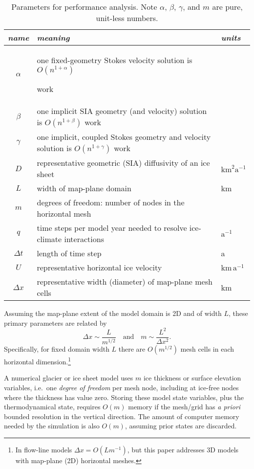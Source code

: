 \documentclass[review,letterpaper]{igs}
\begin{document}
\begin{table*}[ht]
{\normalsize
\begin{tabular}{cll}
\emph{name} & \emph{meaning} & \emph{units} \\ \hline
$\alpha$    & one fixed-geometry Stokes velocity solution is $O(n^{1+\alpha})${\large \strut} work\\
$\beta$     & one implicit SIA geometry (and velocity) solution is $O(n^{1+\beta})$ work \\
$\gamma$    & one implicit, coupled Stokes geometry and velocity solution is $O(n^{1+\gamma})$ work \\
$D$         & representative geometric (SIA) diffusivity of an ice sheet & $\text{km}^2 \text{a}^{-1}$ \\
$L$         & width of map-plane domain & km \\
$m$         & degrees of freedom: number of nodes in the horizontal mesh \\
$q$         & time steps per model year needed to resolve ice-climate interactions & $\text{a}^{-1}$ \\
$\Delta t$  & length of time step & a \\
$U$         & representative horizontal ice velocity & $\text{km}\,\text{a}^{-1}$ \\
$\Delta x$  & representative width (diameter) of map-plane mesh cells & km
\end{tabular}
}
\caption{Parameters for performance analysis.  Note $\alpha$, $\beta$, $\gamma$, and $m$ are pure, unit-less numbers.}
\label{tab:notation}
\end{table*}

Assuming the map-plane extent of the model domain is 2D and of width $L$, these primary parameters are related by
\begin{equation}
\Delta x \sim \frac{L}{m^{1/2}} \quad \text{and} \quad m \sim \frac{L^2}{\Delta x^2}.  \label{eq:paramrelation}
\end{equation}
Specifically, for fixed domain width $L$ there are $O(m^{1/2})$ mesh cells in each horizontal dimension.\footnote{In flow-line models $\Delta x = O(L m^{-1})$, but this paper addresses 3D models with map-plane (2D) horizontal meshes.}

A numerical glacier or ice sheet model uses $m$ ice thickness or surface elevation variables, i.e.~one \emph{degree of freedom} per mesh node, including at ice-free nodes where the thickness has value zero.  Storing these model state variables, plus the thermodynamical state, requires $O(m)$ memory if the mesh/grid has \emph{a priori} bounded resolution in the vertical direction.  The amount of computer memory needed by the simulation is also $O(m)$, assuming prior states are discarded.
\end{document}
